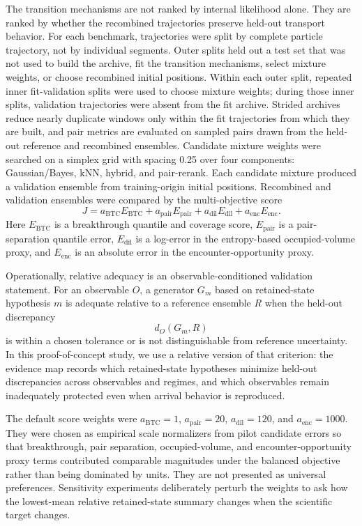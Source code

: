 \documentclass[11pt]{article}
\newcommand{\gb}{Gaussian/Bayes}
\newcommand{\knn}{kNN}
\begin{document}
The transition mechanisms are not ranked by internal likelihood alone. They are ranked by whether the recombined trajectories preserve held-out transport behavior. For each benchmark, trajectories were split by complete particle trajectory, not by individual segments. Outer splits held out a test set that was not used to build the archive, fit the transition mechanisms, select mixture weights, or choose recombined initial positions. Within each outer split, repeated inner fit-validation splits were used to choose mixture weights; during those inner splits, validation trajectories were absent from the fit archive. Strided archives reduce nearly duplicate windows only within the fit trajectories from which they are built, and pair metrics are evaluated on sampled pairs drawn from the held-out reference and recombined ensembles. Candidate mixture weights were searched on a simplex grid with spacing 0.25 over four components: \gb{}, \knn{}, hybrid, and pair-rerank. Each candidate mixture produced a validation ensemble from training-origin initial positions. Recombined and validation ensembles were compared by the multi-objective score
\begin{equation}
  J =
  a_{\mathrm{BTC}} E_{\mathrm{BTC}}
  + a_{\mathrm{pair}} E_{\mathrm{pair}}
  + a_{\mathrm{dil}} E_{\mathrm{dil}}
  + a_{\mathrm{enc}} E_{\mathrm{enc}} .
  \label{eq:objective}
\end{equation}
Here $E_{\mathrm{BTC}}$ is a breakthrough quantile and coverage score, $E_{\mathrm{pair}}$ is a pair-separation quantile error, $E_{\mathrm{dil}}$ is a log-error in the entropy-based occupied-volume proxy, and $E_{\mathrm{enc}}$ is an absolute error in the encounter-opportunity proxy.

Operationally, relative adequacy is an observable-conditioned validation statement. For an observable $O$, a generator $G_m$ based on retained-state hypothesis $m$ is adequate relative to a reference ensemble $R$ when the held-out discrepancy
\begin{equation}
  d_O(G_m, R)
\end{equation}
is within a chosen tolerance or is not distinguishable from reference uncertainty. In this proof-of-concept study, we use a relative version of that criterion: the evidence map records which retained-state hypotheses minimize held-out discrepancies across observables and regimes, and which observables remain inadequately protected even when arrival behavior is reproduced.

The default score weights were $a_{\mathrm{BTC}}=1$, $a_{\mathrm{pair}}=20$, $a_{\mathrm{dil}}=120$, and $a_{\mathrm{enc}}=1000$. They were chosen as empirical scale normalizers from pilot candidate errors so that breakthrough, pair separation, occupied-volume, and encounter-opportunity proxy terms contributed comparable magnitudes under the balanced objective rather than being dominated by units. They are not presented as universal preferences. Sensitivity experiments deliberately perturb the weights to ask how the lowest-mean relative retained-state summary changes when the scientific target changes.
\end{document}
